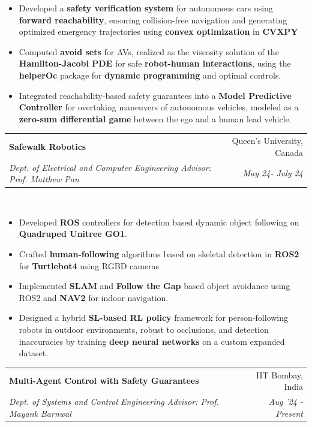 \documentclass[letterpaper,11pt]{article}
\makeatletter
\newcommand{\resumeItem}[1]{
  \item\small{
    {#1 \vspace{-2pt}}
  }
}
\newcommand{\resumeSubheading}[4]{
  \vspace{-2pt}\item
    \begin{tabular*}{0.97\textwidth}[t]{l@{\extracolsep{\fill}}r}
      \textbf{#1} & #2 \\
      \textit{\small#3} & \textit{\small #4} \\
    \end{tabular*}\vspace{-7pt}
}
\newcommand{\resumeItemListStart}{\begin{itemize}}
\newcommand{\resumeItemListEnd}{\end{itemize}\vspace{-5pt}}
\makeatother
\begin{document}
        \resumeItemListStart
            \resumeItem{Developed a\textbf{ safety verification system} for autonomous cars using \textbf{forward reachability}, ensuring collision-free navigation and generating optimized emergency trajectories using \textbf{convex optimization }in \textbf{CVXPY}}
            \resumeItem{Computed\textbf{ avoid sets} for AVs, realized as the viscosity solution of the\textbf{ Hamilton-Jacobi PDE} for safe
            \textbf{robot-human interactions}, using the \textbf{helperOc} package for \textbf{dynamic programming} and optimal controls.}
            \resumeItem{Integrated reachability-based safety guarantees into a \textbf{Model Predictive Controller} for overtaking maneuvers of autonomous vehicles, modeled as a \textbf{zero-sum differential game} between the ego and a human lead vehicle. }
        \resumeItemListEnd
    
    \resumeSubheading
      {Safewalk Robotics \href{https://github.com/prachitgupta/Person-follower/}{\textcolor{blue}\faGithub}}{Queen's University, Canada}
      {Dept. of Electrical and Computer Engineering \textbar \hspace{0.4mm}Advisor: Prof. Matthew Pan}{May 24- July 24}\\
        \resumeItemListStart
            \resumeItem{Developed \textbf{ROS }controllers for detection based dynamic object following on \textbf{Quadruped Unitree GO1}.}
            \resumeItem{Crafted \textbf{human-following} algorithms based on skeletal detection in \textbf{ROS2} for\textbf{ Turtlebot4} using RGBD cameras}
            \resumeItem{Implemented \textbf{SLAM} and \textbf{Follow the Gap} based object avoidance using ROS2 and \textbf{NAV2} for indoor navigation.}
            \resumeItem{Designed a hybrid \textbf{SL-based RL policy} framework for person-following robots in outdoor environments, robust to occlusions, and detection inaccuracies by training \textbf{deep neural networks} on a custom expanded dataset.}
        \resumeItemListEnd

        \resumeSubheading
      {Multi-Agent Control with Safety Guarantees \href{https://github.com/prachitgupta/multi-agent-control/}{\textcolor{blue}\faGithub}}{IIT Bombay, India}
      {  Dept. of Systems and Control Engineering \textbar \hspace{0.4mm}Advisor: Prof. Mayank Barnwal}{Aug ’24 - Present}\\
        
\end{document}
